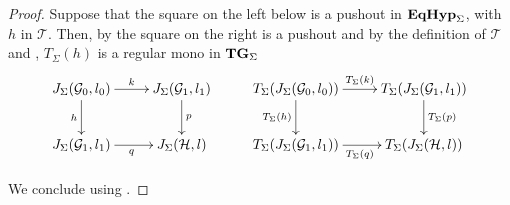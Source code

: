 \documentclass[3p]{elsarticle}
\newcommand{\catname}[1]{\textbf{\textup{#1}}}
\newcommand{\EqHyp}{\catname{EqHyp}} %
\newcommand{\tg}[0]{\catname{TG}_{\Sigma}}
\theoremstyle{remark}
\theoremstyle{definition}
\begin{document}
\po*
\begin{proof}\label{proof:tade}
	Suppose that the square on the left below is a pushout in $\EqHyp_\Sigma$, with $h$ in $\mathcal{T}$. Then, by  the square on the right is a pushout and by the definition of $\mathcal{T}$ and , $T_\Sigma(h)$ is a regular mono in $\tg$
	\[\xymatrix{J_\Sigma(\mathcal{G}_0, l_0) \ar[r]^{k} \ar[d]_{h}& J_\Sigma(\mathcal{G}_1, l_1) \ar[d]^{p} &T_\Sigma (J_\Sigma(\mathcal{G}_0, l_0)) \ar[r]^{T_{\Sigma}(k)} \ar[d]_{T_{\Sigma}(h)}& T_\Sigma (J_\Sigma(\mathcal{G}_1, l_1)) \ar[d]^{T_\Sigma(p)}\\
J_\Sigma(\mathcal{G}_1, l_1) \ar[r]_{q}& J_\Sigma(\mathcal{H}, l) & T_\Sigma(J_\Sigma(\mathcal{G}_1, l_1)) \ar[r]_{T_\Sigma(q)}& T_\Sigma(J_\Sigma(\mathcal{H}, l))}\]
	
	We conclude using .
\end{proof}
\end{document}
